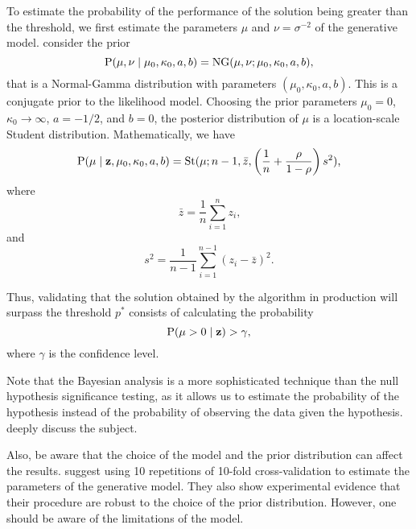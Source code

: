 To estimate the probability of the performance of the solution being greater than the
threshold, we first estimate the parameters $\mu$ and $\nu = \sigma^{-2}$ of the
generative model.  \citeauthor{Benavoli2017} consider the prior
\begin{equation*}
  \operatorname{P}(\mu, \nu \mid \mu_0, \kappa_0, a, b) = \operatorname{NG}(\mu, \nu; \mu_0, \kappa_0, a, b)\text{,}
\end{equation*}
that is a Normal-Gamma distribution with parameters $(\mu_0, \kappa_0, a, b)$.  This is a
conjugate prior to the likelihood model.  Choosing the prior parameters $\mu_0 = 0$,
$\kappa_0 \to \infty$, $a = -1/2$, and $b = 0$, the posterior distribution of $\mu$ is a
location-scale Student distribution.  Mathematically, we have
\begin{equation*}
  \operatorname{P}(\mu \mid \mathbf{z}, \mu_0, \kappa_0, a, b) =
    \operatorname{St}(\mu; n - 1, \bar{z}, \left(
      \frac{1}{n} + \frac{\rho}{1 - \rho}
    \right)s^2)\text{,}
\end{equation*}
where
\begin{equation*}
  \bar{z} = \frac{1}{n} \sum_{i=1}^n z_i\text{,}
\end{equation*}
and
\begin{equation*}
  s^2 = \frac{1}{n - 1} \sum_{i=1}^{n-1} (z_i - \bar{z})^2\text{.}
\end{equation*}

Thus, validating that the solution obtained by the algorithm in production will surpass
the threshold $p^{*}$ consists of calculating the probability
\begin{equation*}
  \operatorname{P}(\mu > 0 \mid \mathbf{z}) > \gamma\text{,}
\end{equation*}
where $\gamma$ is the confidence level.

Note that the Bayesian analysis is a more sophisticated technique than the null hypothesis
significance testing, as it allows us to estimate the probability of the hypothesis
instead of the probability of observing the data given the hypothesis.
\textcite{Benavoli2017} deeply discuss the subject.

Also, be aware that the choice of the model and the prior distribution can affect the
results.  \citeauthor{Benavoli2017} suggest using 10 repetitions of 10-fold cross-validation
to estimate the parameters of the generative model.  They also show experimental evidence
that their procedure are robust to the choice of the prior distribution.  However, one
should be aware of the limitations of the model.

